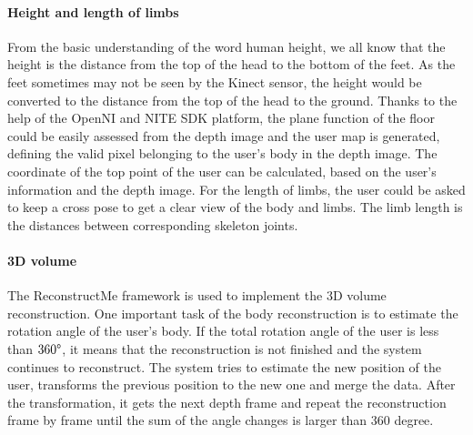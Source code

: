 \paragraph{Height and length of limbs}
From the basic understanding of the word human height, we all know that the height is the distance from the top of the head to the bottom of the feet. 
As the feet sometimes may not be seen by the Kinect sensor, the height would be converted to the distance from the top of the head to the ground.
Thanks to the help of the OpenNI and NITE SDK platform, the plane function of the floor could be easily assessed from the depth image and the user map is generated, defining the valid pixel belonging to the user's body in the depth image.
The coordinate of the top point of the user can be calculated, based on the user's information and the depth image. 
For the length of limbs, the user could be asked to keep a cross pose to get a clear view of the body and limbs. The limb length is the distances between corresponding skeleton joints.

\paragraph{3D volume}
The ReconstructMe framework is used to implement the 3D volume reconstruction.
One important task of the body reconstruction is to estimate the rotation angle of the user's body. If the total rotation angle of the user is less than $360\degree$, it means that the reconstruction is not finished and the system continues to reconstruct. The system tries to estimate the new position of the user, transforms the previous position to the new one and merge the data. After the transformation, it gets the next depth frame and repeat the reconstruction frame by frame until the sum of the angle changes is larger than 360 degree. %

